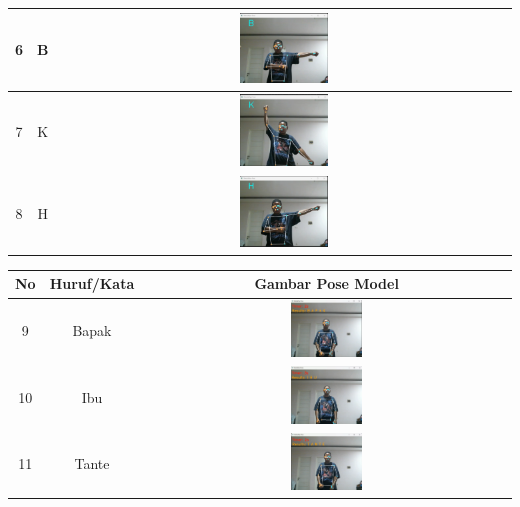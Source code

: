 \begin{table}[h]
\begin{tabular}{|c|c|c|}
		\hline
		6 & B & \includegraphics[width=0.2\textwidth]{gambar/bener/HurufB_ModelCNN2_Fachry.png} \\
		\hline
		7 & K & \includegraphics[width=0.2\textwidth]{gambar/bener/HurufK_ModelCNN2_Fachry.png} \\
		\hline
		8 & H & \includegraphics[width=0.2\textwidth]{gambar/bener/HurufH_ModelCNN2_Fachry.png} \\
		\hline
		\end{tabular}
		\end{table}

		\begin{table}[h]
			\centering
			\begin{tabular}{|c|c|c|}
				\hline
				No & Huruf/Kata & Gambar Pose Model  \\
				\hline
				9 & Bapak & \includegraphics[width=0.2\textwidth]{gambar/bener/HurufBapak_ModelCNN2_Fachry.png} \\
				\hline
				10 & Ibu & \includegraphics[width=0.2\textwidth]{gambar/bener/HurufIbu_ModelCNN2_Fachry.png} \\
				\hline
				11 & Tante & \includegraphics[width=0.2\textwidth]{gambar/bener/HurufTante_ModelCNN2_Fachry.png} \\
				\hline
			\end{tabular}
		\end{table}

